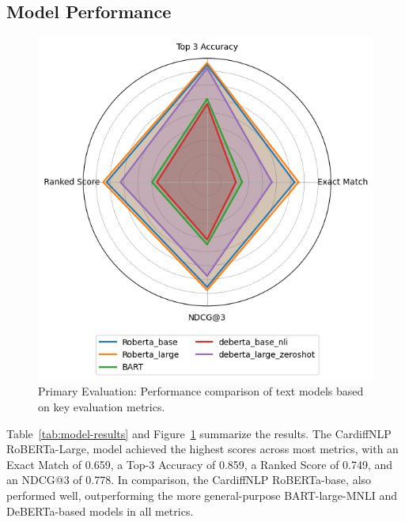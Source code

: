 \subsection{Model Performance}
\begin{figure}[ht]
    \centering
    \includegraphics[width=0.5\linewidth, height=0.34\textheight]{images/model_comp1.png}
    \caption{Primary Evaluation: Performance comparison of text models based on key evaluation metrics.}
    \label{fig:model-comp}
\end{figure}

Table~\ref{tab:model-results} and Figure~\ref{fig:model-comp} summarize the results. The CardiffNLP RoBERTa-Large, model achieved the highest scores across most metrics, with an Exact Match of 0.659, a Top-3 Accuracy of 0.859, a Ranked Score of 0.749, and an NDCG@3 of 0.778. In comparison, the CardiffNLP RoBERTa-base, also performed well, outperforming the more general-purpose BART-large-MNLI and DeBERTa-based models in all metrics.
\newline

\begin{table}[htbp]
    \centering
    \caption{Primary Evaluation: Performance of the text models on the annotated subset ($n=99$).}
    \label{tab:model-results}
\end{table}

